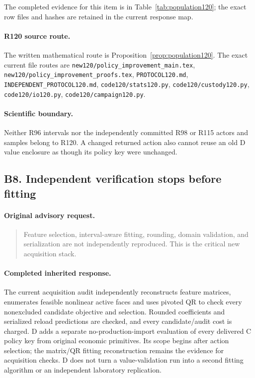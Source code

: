 The completed evidence for this item is in Table~\ref{tab:population120}; the exact row files and hashes are retained in the current response map.
\paragraph{R120 source route.}
The written mathematical route is Proposition~\ref{prop:population120}. The exact current file routes are \nolinkurl{new120/policy_improvement_main.tex}, \nolinkurl{new120/policy_improvement_proofs.tex}, \nolinkurl{PROTOCOL120.md}, \nolinkurl{INDEPENDENT_PROTOCOL120.md}, \nolinkurl{code120/stats120.py}, \nolinkurl{code120/custody120.py}, \nolinkurl{code120/io120.py}, \nolinkurl{code120/campaign120.py}.
\paragraph{Scientific boundary.}
Neither R96 intervals nor the independently committed R98 or R115 actors and samples belong to R120. A changed returned action also cannot reuse an old D value enclosure as though its policy key were unchanged.

\subsection{B8. Independent verification stops before fitting}
\label{response120:B8}
\paragraph{Original advisory request.}
\begin{quote}
Feature selection, interval-aware fitting, rounding, domain validation, and serialization are not independently reproduced. This is the critical new acquisition stack.
\end{quote}
\paragraph{Completed inherited response.}
The current acquisition audit independently reconstructs feature matrices, enumerates feasible nonlinear active faces and uses pivoted QR to check every nonexcluded candidate objective and selection. Rounded coefficients and serialized reload predictions are checked, and every candidate/audit cost is charged. D adds a separate no-production-import evaluation of every delivered C policy key from original economic primitives. Its scope begins after action selection; the matrix/QR fitting reconstruction remains the evidence for acquisition checks. D does not turn a value-validation run into a second fitting algorithm or an independent laboratory replication.
